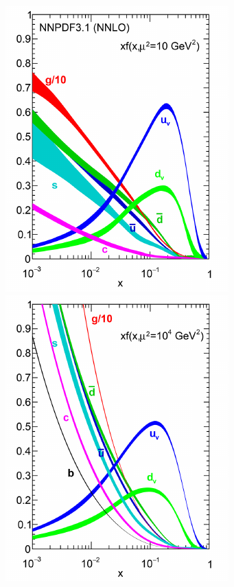 \begin{marginfigure}
  \centering
  \includegraphics[width=0.99\marginparwidth]{Assets/Plots/SM/NNPDF_PDF_mu2-10GeV2.pdf}\\
  \includegraphics[width=0.99\marginparwidth]{Assets/Plots/SM/NNPDF_PDF_mu2-10000GeV2.pdf}
  \caption{Funciones de distribución partónica (PDF) usando predicciones NNLO (\textit{next-to-next-to-leading order}) de quarks y gluones en protones, para escalas de factorización $\mu_F^2$ \SI{10}{\GeV^2} y $10^4\si{\GeV^2}$~.}
  \label{fig:ch1:SM:pp_interactions:pdf}
\end{marginfigure}

